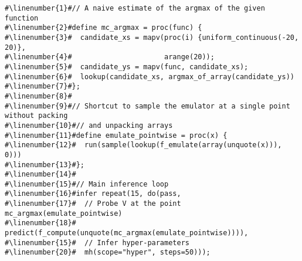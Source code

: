 \begin{mdframed}
\begin{minipage}{\linewidth}
\small
\belowcaptionskip=-10pt
\begin{lstlisting}[caption={Bayesian optimization with uniformly distributed
proposals},mathescape,numbers=none,label=alg:uniform_bayesopt,escapechar=\#]
#\linenumber{1}#// A naive estimate of the argmax of the given function
#\linenumber{2}#define mc_argmax = proc(func) {
#\linenumber{3}#  candidate_xs = mapv(proc(i) {uniform_continuous(-20, 20)},
#\linenumber{4}#                      arange(20));
#\linenumber{5}#  candidate_ys = mapv(func, candidate_xs);
#\linenumber{6}#  lookup(candidate_xs, argmax_of_array(candidate_ys))
#\linenumber{7}#};
#\linenumber{8}#
#\linenumber{9}#// Shortcut to sample the emulator at a single point without packing
#\linenumber{10}#// and unpacking arrays
#\linenumber{11}#define emulate_pointwise = proc(x) {
#\linenumber{12}#  run(sample(lookup(f_emulate(array(unquote(x))), 0)))
#\linenumber{13}#};
#\linenumber{14}#
#\linenumber{15}#// Main inference loop
#\linenumber{16}#infer repeat(15, do(pass,
#\linenumber{17}#  // Probe V at the point mc_argmax(emulate_pointwise)
#\linenumber{18}#  predict(f_compute(unquote(mc_argmax(emulate_pointwise)))),
#\linenumber{15}#  // Infer hyper-parameters
#\linenumber{20}#  mh(scope="hyper", steps=50)));
\end{lstlisting}

\end{minipage}
\end{mdframed}

